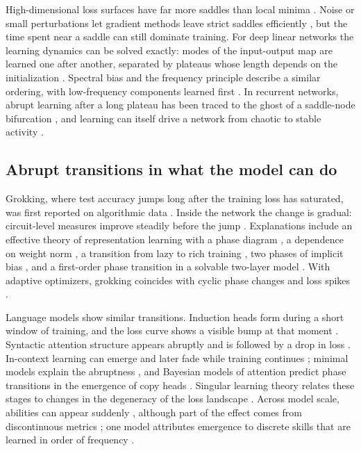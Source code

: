 High-dimensional loss surfaces have far more saddles than local minima \citep{dauphin2014identifying}. Noise or small perturbations let gradient methods leave strict saddles efficiently \citep{ge2015escaping,jin2017escape}, but the time spent near a saddle can still dominate training. For deep linear networks the learning dynamics can be solved exactly: modes of the input-output map are learned one after another, separated by plateaus whose length depends on the initialization \citep{saxe2013exact}. Spectral bias and the frequency principle describe a similar ordering, with low-frequency components learned first \citep{rahaman2018spectral,xu2019frequency}. In recurrent networks, abrupt learning after a long plateau has been traced to the ghost of a saddle-node bifurcation \citep{dinc2025ghost}, and learning can itself drive a network from chaotic to stable activity \citep{vaidya2026learninginduced}.

\subsection{Abrupt transitions in what the model can do}
\label{sec:transitions}

Grokking, where test accuracy jumps long after the training loss has saturated, was first reported on algorithmic data \citep{power2022grokking}. Inside the network the change is gradual: circuit-level measures improve steadily before the jump \citep{nanda2023progress}. Explanations include an effective theory of representation learning with a phase diagram \citep{liu2022grokking}, a dependence on weight norm \citep{liu2022omnigrok}, a transition from lazy to rich training \citep{kumar2023grokking}, two phases of implicit bias \citep{lyu2023dichotomy}, and a first-order phase transition in a solvable two-layer model \citep{rubin2023grokking}. With adaptive optimizers, grokking coincides with cyclic phase changes and loss spikes \citep{thilak2022slingshot}.

Language models show similar transitions. Induction heads form during a short window of training, and the loss curve shows a visible bump at that moment \citep{olsson2022incontext}. Syntactic attention structure appears abruptly and is followed by a drop in loss \citep{chen2023sudden}. In-context learning can emerge and later fade while training continues \citep{singh2023transient}; minimal models explain the abruptness \citep{reddy2023mechanistic}, and Bayesian models of attention predict phase transitions in the emergence of copy heads \citep{lavie2026phase}. Singular learning theory relates these stages to changes in the degeneracy of the loss landscape \citep{hoogland2024loss}. Across model scale, abilities can appear suddenly \citep{wei2022emergent}, although part of the effect comes from discontinuous metrics \citep{schaeffer2023emergent}; one model attributes emergence to discrete skills that are learned in order of frequency \citep{michaud2023quantization}.

